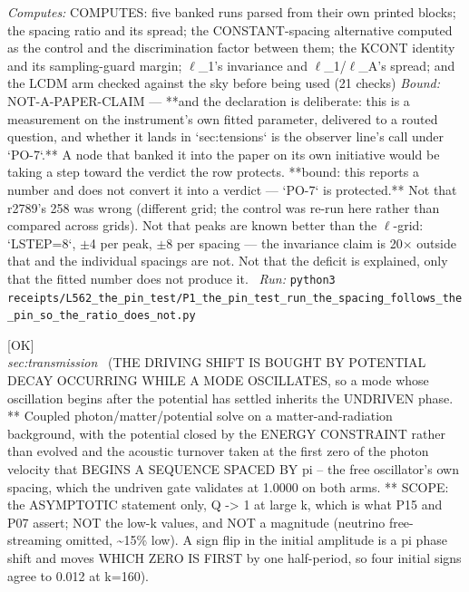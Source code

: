 \begin{description}
\emph{Computes:} COMPUTES: five banked runs parsed from their own printed blocks; the spacing ratio and its spread; the CONSTANT-spacing alternative computed as the control and the discrimination factor between them; the KCONT identity and its sampling-guard margin; \ensuremath{\ell}\_1's invariance and \ensuremath{\ell}\_1/\ensuremath{\ell}\_A's spread; and the LCDM arm checked against the sky before being used (21 checks)
 \emph{Bound:} NOT-A-PAPER-CLAIM --- **and the declaration is deliberate: this is a measurement on the instrument's own fitted parameter, delivered to a routed question, and whether it lands in `sec:tensions` is the observer line's call under `PO-7`.** A node that banked it into the paper on its own initiative would be taking a step toward the verdict the row protects. **bound: this reports a number and does not convert it into a verdict --- `PO-7` is protected.** Not that r2789's 258 was wrong (different grid; the control was re-run here rather than compared across grids). Not that peaks are known better than the \ensuremath{\ell}-grid: `LSTEP=8`, \ensuremath{\pm}4 per peak, \ensuremath{\pm}8 per spacing --- the invariance claim is 20\ensuremath{\times} outside that and the individual spacings are not. Not that the deficit is explained, only that the fitted number does not produce it.
\ \emph{Run:} \texttt{python3 receipts/L562\_the\_pin\_test/P1\_the\_pin\_test\_run\_the\_spacing\_follows\_the\_pin\_so\_the\_ratio\_does\_not.py}
\item[\label{rcpt:P15_the_driving_is_bought_by_decay_during_oscillation}\texttt{P15\_the\_driving\_is\_bought\_by\_decay\_during\_oscillation}]\hfill\textsf{[OK]}\\
\textit{sec:transmission} \ (THE DRIVING SHIFT IS BOUGHT BY POTENTIAL DECAY OCCURRING WHILE A MODE OSCILLATES, so a mode whose oscillation begins after the potential has settled inherits the UNDRIVEN phase. ** Coupled photon/matter/potential solve on a matter-and-radiation background, with the potential closed by the ENERGY CONSTRAINT rather than evolved and the acoustic turnover taken at the first zero of the photon velocity that BEGINS A SEQUENCE SPACED BY pi -- the free oscillator's own spacing, which the undriven gate validates at 1.0000 on both arms. ** SCOPE: the ASYMPTOTIC statement only, Q -> 1 at large k, which is what P15 and P07 assert; NOT the low-k values, and NOT a magnitude (neutrino free-streaming omitted, \textasciitilde{}15\% low). A sign flip in the initial amplitude is a pi phase shift and moves WHICH ZERO IS FIRST by one half-period, so four initial signs agree to 0.012 at k=160). 

\end{description}
